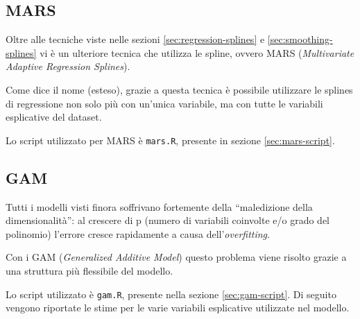 
\subsection{MARS}\label{sec:mars}
Oltre alle tecniche viste nelle sezioni \ref{sec:regression-splines} e
\ref{sec:smoothing-splines} vi è un ulteriore tecnica che utilizza le spline,
ovvero MARS (\emph{Multivariate Adaptive Regression Splines}).

Come dice il nome (esteso), grazie a questa tecnica è possibile utilizzare le
splines di regressione non solo più con un'unica variabile, ma con tutte le
variabili esplicative del dataset.

Lo script utilizzato per MARS è \texttt{mars.R}, presente in sezione
\ref{sec:mars-script}.


\subsection{GAM}\label{sec:gam}
Tutti i modelli visti finora soffrivano fortemente della ``maledizione della
dimensionalità'': al crescere di p (numero di variabili coinvolte e/o grado del
polinomio) l'errore cresce rapidamente a causa dell'\emph{overfitting}.

Con i GAM (\emph{Generalized Additive Model}) questo problema viene risolto
grazie a una struttura più flessibile del modello.

Lo script utilizzato è \texttt{gam.R}, presente nella sezione
\ref{sec:gam-script}. Di seguito vengono riportate le stime per le varie
variabili esplicative utilizzate nel modello.

